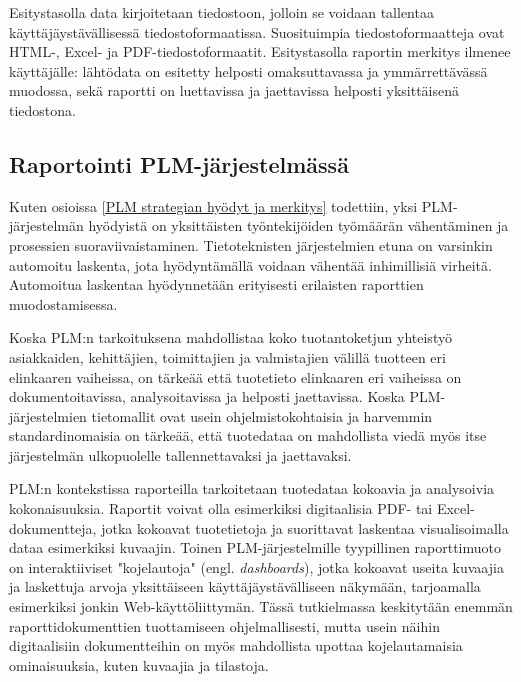Esitystasolla data kirjoitetaan tiedostoon, jolloin se voidaan tallentaa käyttäjäystävällisessä tiedostoformaatissa. \cite{he_design_2010} Suosituimpia tiedostoformaatteja ovat HTML-, Excel- ja PDF-tiedostoformaatit. \cite{he_design_2010} Esitystasolla raportin merkitys ilmenee käyttäjälle: lähtödata on esitetty helposti omaksuttavassa ja ymmärrettävässä muodossa, sekä raportti on luettavissa ja jaettavissa helposti yksittäisenä tiedostona.

\subsection{Raportointi PLM-järjestelmässä} \label{Raportointi PLM-järjestelmässä}

Kuten osioissa \ref{PLM strategian hyödyt ja merkitys} todettiin, yksi PLM-järjestelmän hyödyistä on yksittäisten työntekijöiden työmäärän vähentäminen ja prosessien suoraviivaistaminen. Tietoteknisten järjestelmien etuna on varsinkin automoitu laskenta, jota hyödyntämällä voidaan vähentää inhimillisiä virheitä. \cite{niu_organizational_2021} \cite{rakovic_digital_2022} Automoitua laskentaa hyödynnetään erityisesti erilaisten raporttien muodostamisessa.

Koska PLM:n tarkoituksena mahdollistaa koko tuotantoketjun yhteistyö asiakkaiden, kehittäjien, toimittajien ja valmistajien välillä tuotteen eri elinkaaren vaiheissa,  \cite{bouhaddou_plm_2012} on tärkeää että tuotetieto elinkaaren eri vaiheissa on dokumentoitavissa, analysoitavissa ja helposti jaettavissa. Koska PLM-järjestelmien tietomallit ovat usein ohjelmistokohtaisia ja harvemmin standardinomaisia  \cite{SritiMohamed-Foued2012PTaS} on tärkeää, että tuotedataa on mahdollista viedä myös itse järjestelmän ulkopuolelle tallennettavaksi ja jaettavaksi.

PLM:n kontekstissa raporteilla tarkoitetaan tuotedataa kokoavia ja analysoivia kokonaisuuksia. Raportit voivat olla esimerkiksi digitaalisia PDF- tai Excel-dokumentteja, jotka kokoavat tuotetietoja ja suorittavat laskentaa visualisoimalla dataa esimerkiksi kuvaajin. Toinen PLM-järjestelmille tyypillinen raporttimuoto on interaktiiviset "kojelautoja" (engl. \textit{dashboards}), jotka kokoavat useita kuvaajia ja laskettuja arvoja yksittäiseen käyttäjäystävälliseen näkymään, tarjoamalla esimerkiksi jonkin Web-käyttöliittymän. Tässä tutkielmassa keskitytään enemmän raporttidokumenttien tuottamiseen ohjelmallisesti, mutta usein näihin digitaalisiin dokumentteihin on myös mahdollista upottaa kojelautamaisia ominaisuuksia, kuten kuvaajia ja tilastoja.

